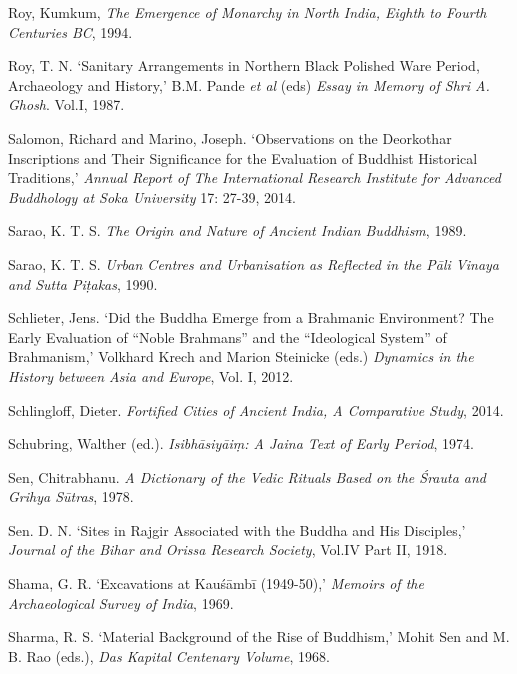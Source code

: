 \label{footprints_split_022.html_Royux20Kux201994}
Roy, Kumkum, \emph{The Emergence of Monarchy in North India, Eighth to
Fourth Centuries BC}, 1994.

\label{footprints_split_022.html_Royux201987}
Roy, T. N. `Sanitary Arrangements in Northern Black Polished Ware
Period, Archaeology and History,' B.M. Pande \emph{et al} (eds)
\emph{Essay in Memory of Shri A. Ghosh}. Vol.I, 1987.

\label{footprints_split_022.html_Salomon-Marinoux202014}
Salomon, Richard and Marino, Joseph. `Observations on the Deorkothar
Inscriptions and Their Significance for the Evaluation of Buddhist
Historical Traditions,' \emph{Annual Report of The International
Research Institute for Advanced Buddhology at Soka University} 17:
27-39, 2014.

\label{footprints_split_022.html_Saraoux201989}
Sarao, K. T. S. \emph{The Origin and Nature of Ancient Indian Buddhism},
1989.

Sarao, K. T. S. \emph{Urban Centres and Urbanisation as Reflected in the
Pāli Vinaya and Sutta Piṭakas}, 1990.

\label{footprints_split_022.html_Schlieterux202012}
Schlieter, Jens. `Did the Buddha Emerge from a Brahmanic Environment?
The Early Evaluation of ``Noble Brahmans'' and the ``Ideological
System'' of Brahmanism,' Volkhard Krech and Marion Steinicke (eds.)
\emph{Dynamics in the History between Asia and Europe}, Vol. I, 2012.

\label{footprints_split_022.html_Schlingloffux202014}
Schlingloff, Dieter. \emph{Fortified Cities of Ancient India, A
Comparative Study}, 2014.

\label{footprints_split_022.html_Schubringux201974}
Schubring, Walther (ed.). \emph{Isibhāsiyāiṃ: A Jaina Text of Early
Period}, 1974.

Sen, Chitrabhanu. \emph{A Dictionary of the Vedic Rituals Based on the
Śrauta and Grihya Sūtras}, 1978.

\label{footprints_split_022.html_Senux201918}
Sen. D. N. `Sites in Rajgir Associated with the Buddha and His
Disciples,' \emph{Journal of the Bihar and Orissa Research Society},
Vol.IV Part II, 1918.

Shama, G. R. `Excavations at Kauśāmbī (1949-50),' \emph{Memoirs of the
Archaeological Survey of India}, 1969.

Sharma, R. S. `Material Background of the Rise of Buddhism,' Mohit Sen
and M. B. Rao (eds.), \emph{Das Kapital Centenary Volume}, 1968.

